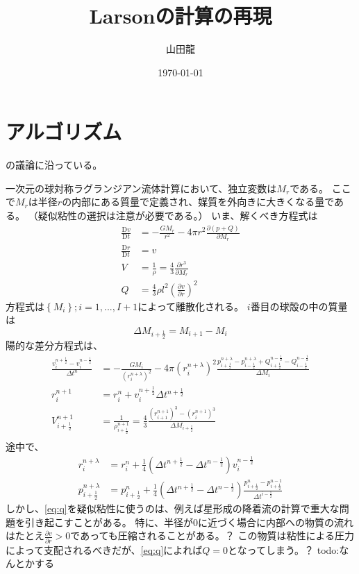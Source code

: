 \documentclass{jsarticle}
\date{\today}
\author{山田龍}
\title{Larsonの計算の再現}
\newcommand{\pder}[2][]{\frac{\partial#1}{\partial#2}}
\newcommand{\Dder}[2][]{\frac{\mathrm{D}#1}{\mathrm{D}#2}}
\newcommand{\half}{\frac{1}{2}}
\newcommand{\hpn}{n + \half}
\newcommand{\hpi}{i + \half}
\newcommand{\hmi}{i - \half}
\newcommand{\beq}{\begin{equation}}
\newcommand{\eeq}{\end{equation}}
\begin{document}
\maketitle
\section{アルゴリズム}
\cite{RadHy}の議論に沿っている。

一次元の球対称ラグランジアン流体計算において、独立変数は$M_r$である。
ここで$M_r$は半径$r$の内部にある質量で定義され、媒質を外向きに大きくなる量である。
（疑似粘性の選択は注意が必要である。）
いま、解くべき方程式は
\begin{align}
    \Dder[v]{t} &= - \frac{GM_r}{r^2} - 4\pi r^2\pder[(p + Q)]{M_r}\\
    \Dder[r]{t} &= v\\
    V &= \frac{1}{\rho}=\frac{4}{3}\pder[r^3]{M_r}\\
    Q &= \frac{4}{3}\rho l^2 (\pder[v]{r})^2\label{eq:q}
\end{align}
方程式は$\left\{M_i\right\};i = 1,...,I+1$によって離散化される。
$i$番目の球殻の中の質量は
\beq
    \Delta M_{i+\half} = M_{i+1} - M_i
\eeq
陽的な差分方程式は、
\begin{align}
    \frac{v^{n+\half}_i - v^{n-\half}_i}{\Delta t^n} &= -\frac{GM_i}{(r^{n+\lambda}_i)^2}
    -4\pi(r^{n+\lambda}_i)^2
    \frac{p^{n+\lambda}_{i+\half} - p^{n+\lambda}_{i-\half}+Q^{n-\half}_{i+\half} - Q^{n-\half}_{i-\half}}{\Delta M_i}\\
    r^{n+1}_i &= r^{n}_i + v^{\hpn}_i \Delta t^{\hpn}\\
    V^{n+1}_{\hpi} &= \frac{1}{\rho^{n+1}_{\hpi}}=\frac{4}{3}\frac{(r^{n+1}_{i+1})^3 - (r^{n+1}_{i})^3}{\Delta M_{\hpi}}\\
\end{align}
途中で、
\begin{align}
    r^{n+\lambda}_i &= r^n_i + \frac{1}{4} (\Delta t^{n+\half} - \Delta t^{n-\half})v^{n-\half}_i\\
    p^{n+\lambda}_{\hpi} &=  p^{n}_{\hpi} + \frac{1}{4} (\Delta t^{n+\half} - \Delta t^{n-\half})
    \frac{p^{n}_{\hpi} - p^{n-1}_{\hpi}}{\Delta t^{\hmi}}
\end{align}
しかし、\eqref{eq:q}を疑似粘性に使うのは、例えば星形成の降着流の計算で重大な問題を引き起こすことがある。
特に、半径が0に近づく場合に内部への物質の流れはたとえ$\pder[v]{r}>0$であっても圧縮されることがある。？
この物質は粘性による圧力によって支配されるべきだが、\eqref{eq:q}によれば$Q=0$となってしまう。？
todo:なんとかする
\end{document}
